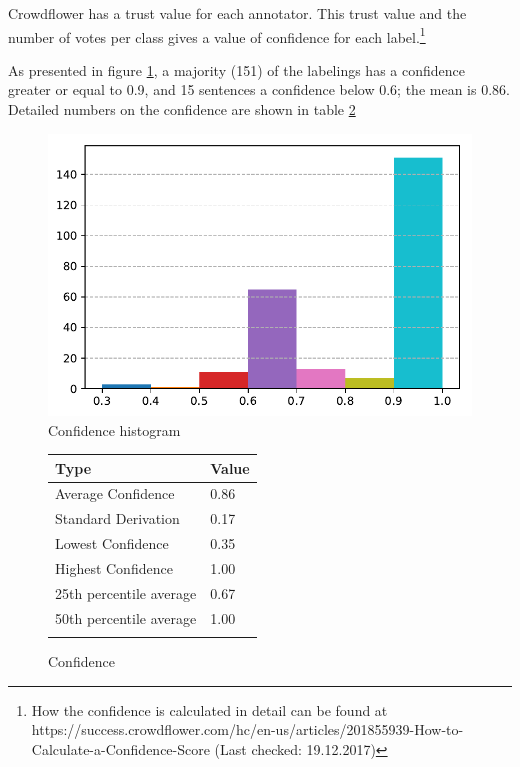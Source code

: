 

Crowdflower has a trust value for each annotator. This trust value and the number of votes per class gives a value of confidence for each label.\footnote{How the confidence is calculated in detail can be found at https://success.crowdflower.com/hc/en-us/articles/201855939-How-to-Calculate-a-Confidence-Score (Last checked: 19.12.2017)}


As presented in figure \ref{pre:conf}, a majority (151) of the labelings has a confidence greater or equal to 0.9, and 15 sentences a confidence below 0.6; the mean is 0.86. Detailed numbers on the confidence are shown in table \ref{pre:conf-table}

\begin{figure}
\centering
\caption{Confidence histogram}
\label{pre:conf}
\includegraphics[scale=0.6]{images/prestudy/confidence.pdf}
\end{figure}


\begin{figure}[h]
\centering
\caption{Confidence}
\begin{tabular}{@{}ll@{}}
\toprule
Type & Value  \\ \midrule
Average Confidence & 0.86 \\
Standard Derivation & 0.17 \\
Lowest Confidence & 0.35\\
Highest Confidence & 1.00\\
25th percentile average & 0.67\\
50th percentile average & 1.00\\
\bottomrule
\label{pre:conf-table}
\end{tabular}
\end{figure}





